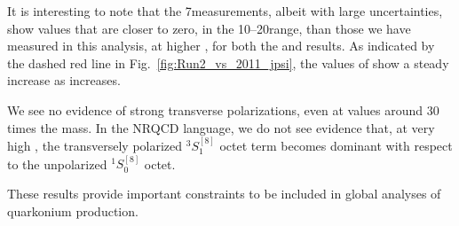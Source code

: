 \vfill\newpage

It is interesting to note that the 7\TeV measurements, albeit with large uncertainties, 
show \lth values that are closer to zero, in the 10--20\GeV \pt range,
than those we have measured in this analysis, at higher \pt,
for both the \jpsi and \psip results.
As indicated by the dashed red line in Fig.~\ref{fig:Run2_vs_2011_jpsi},
the values of \lth show a steady increase as \pt increases.

We see no evidence of strong transverse polarizations, 
even at \pt values around 30 times the \jpsi mass.
In the NRQCD language, we do not see evidence that, at very high \pt,
the transversely polarized ${}^3S_1^{[8]}$ octet term becomes dominant 
with respect to the unpolarized ${}^1S_0^{[8]}$ octet.

These results provide important constraints to be included 
in global analyses of quarkonium production.


